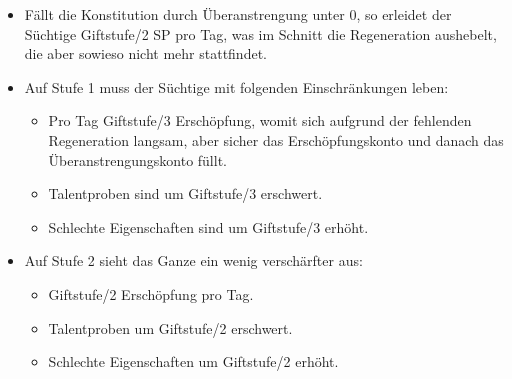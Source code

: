 \begin{itemize}
\begin{itemize}
			\item Fällt die Konstitution durch Überanstrengung unter 0, so erleidet der Süchtige Giftstufe/2 SP pro Tag, was im Schnitt die Regeneration aushebelt, die aber sowieso nicht mehr stattfindet.
			\item Auf Stufe 1 muss der Süchtige mit folgenden Einschränkungen leben: 
				\begin{itemize}
					\item Pro Tag Giftstufe/3 Erschöpfung, womit sich aufgrund der fehlenden Regeneration langsam, aber sicher das Erschöpfungskonto und danach das Überanstrengungskonto füllt. 
					\item Talentproben sind um Giftstufe/3 erschwert.
					\item Schlechte Eigenschaften sind um Giftstufe/3 erhöht.
				\end{itemize}
			\item Auf Stufe 2 sieht das Ganze ein wenig verschärfter aus: 
				\begin{itemize}
					\item Giftstufe/2 Erschöpfung pro Tag.
					\item Talentproben um Giftstufe/2 erschwert.
					\item Schlechte Eigenschaften um Giftstufe/2 erhöht.
				\end{itemize}
		\end{itemize}
\end{itemize}

